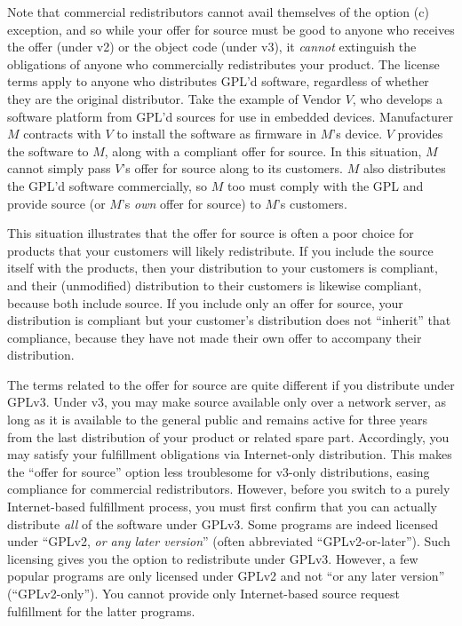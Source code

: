 \documentclass[letterpaper]{fixme}
\begin{document}
Note that commercial redistributors cannot avail themselves of the option
(c) exception, and so while your offer for source must be good to anyone
who receives the offer (under v2) or the object code (under v3), it
\emph{cannot} extinguish the obligations of anyone who commercially
redistributes your product.  The license terms apply to anyone who
distributes GPL'd software, regardless of whether they are the original
distributor.  Take the example of Vendor $V$, who develops a software
platform from GPL'd sources for use in embedded devices.  Manufacturer $M$
contracts with $V$ to install the software as firmware in $M$'s device.
$V$ provides the software to $M$, along with a compliant offer for source.
In this situation, $M$ cannot simply pass $V$'s offer for source along to
its customers.  $M$ also distributes the GPL'd software commercially, so
$M$ too must comply with the GPL and provide source (or $M$'s \emph{own}
offer for source) to $M$'s customers.

This situation illustrates that the offer for source is often a poor
choice for products that your customers will likely redistribute.  If you
include the source itself with the products, then your distribution to
your customers is compliant, and their (unmodified) distribution to their
customers is likewise compliant, because both include source.  If you
include only an offer for source, your distribution is compliant but your
customer's distribution does not ``inherit'' that compliance, because they
have not made their own offer to accompany their distribution.

The terms related to the offer for source are quite different if you
distribute under GPLv3.  Under v3, you may make source available only over
a network server, as long as it is available to the general public and
remains active for three years from the last distribution of your product
or related spare part.  Accordingly, you may satisfy your fulfillment
obligations via Internet-only distribution.  This makes the ``offer for
source'' option less troublesome for v3-only distributions, easing
compliance for commercial redistributors.  However, before you switch to a
purely Internet-based fulfillment process, you must first confirm that you
can actually distribute \emph{all} of the software under GPLv3.  Some
programs are indeed licensed under ``GPLv2, \emph{or any later version}''
(often abbreviated ``GPLv2-or-later'').  Such licensing gives you the
option to redistribute under GPLv3.  However, a few popular programs are
only licensed under GPLv2 and not ``or any later version''
(``GPLv2-only'').  You cannot provide only Internet-based source request
fulfillment for the latter programs.
\end{document}
